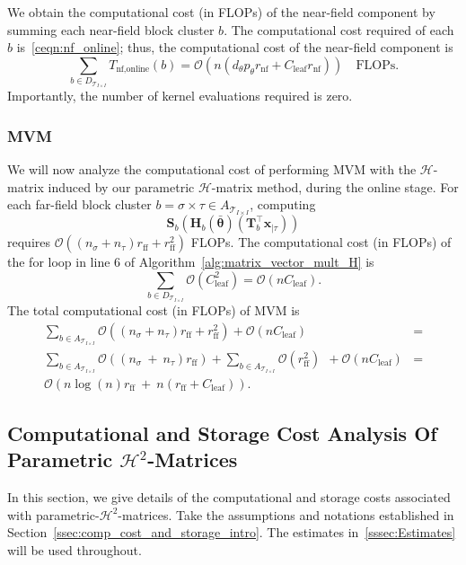 \documentclass[final,3p,times]{elsarticle}
\newcommand{\mc}[1]{\mathcal{#1}}
\renewcommand{\vec}[1]{\boldsymbol{#1}}
\newcommand{\mat}[1]{\boldsymbol{#1}}
\begin{document}
We obtain the computational cost (in FLOPs) of the near-field component by summing each near-field block cluster $b$. The computational cost required of each $b$ is~\eqref{ceqn:nf_online}; thus, the computational cost of the near-field component is
$$\sum_{b \in D_{\mc{T}_{I \times I}}}T_{\text{nf}, \text{online}}(b) = \mc{O}(n(d_{\theta}p_{\theta}r_{\text{nf}} + C_{\text{leaf}}r_{\text{nf}} )) \quad \text{FLOPs}.$$
Importantly, the number of kernel evaluations required is zero.  

\subsubsection{MVM}
We will now analyze the computational cost of performing MVM with the $\mc{H}$-matrix induced by our parametric $\mc{H}$-matrix method, during the online stage. For each far-field block cluster $b = \sigma \times \tau \in A_{\mc{T}_{I \times I}}$, computing $$\mat{S}_{b}(\mat{H}_b(\bar{\vec{\theta}})(\mat{T}_{b}^{\top}\vec{x}_{|\tau}))$$ requires $\mc{O}((n_{\sigma} + n_{\tau})r_{\text{ff}} + r_{\text{ff}}^2)$ FLOPs. The computational cost (in FLOPs) of the for loop
 in line 6 of Algorithm~\ref{alg:matrix_vector_mult_H} is
$$\sum_{b \in D_{\mc{T}_{I \times I}}} \mc{O}(C_{\text{leaf}}^2) = \mc{O}(nC_{\text{leaf}}).$$
The total computational cost (in FLOPs) of MVM is
$$
\begin{aligned}
\sum_{b\in A_{\mc{T}_{I \times I}}}\mc{O}((n_{\sigma} + n_{\tau})r_{\text{ff}} + r_{\text{ff}}^2) + \mc{O}(nC_{\text{leaf}}) &= \\ \sum_{b \in A_{\mc{T}_{I \times I}}}\mc{O}((n_{\sigma} ~+~ n_{\tau})r_{\text{ff}}) + \sum_{b \in A_{\mc{T}_{I \times I}}}\mc{O}(r_{\text{ff}}^2)   ~ ~ + \mc{O}(nC_{\text{leaf}})  &=  \\
\mc{O}(n\log(n)r_{\text{ff}}  ~ + ~ n(r_{\text{ff}} + C_{\text{leaf}})).
\end{aligned}
$$


\subsection{Computational and Storage Cost Analysis Of Parametric \texorpdfstring{$\mc{H}^{2}$}{}-Matrices} \label{ssec:complexity_anaysis_h2matrix}
In this section, we give details of the computational and storage costs associated with parametric-$\mc{H}^2$-matrices. Take the assumptions and notations established in Section~\ref{ssec:comp_cost_and_storage_intro}.   The  estimates in~\ref{sssec:Estimates} will be used throughout.
\end{document}
